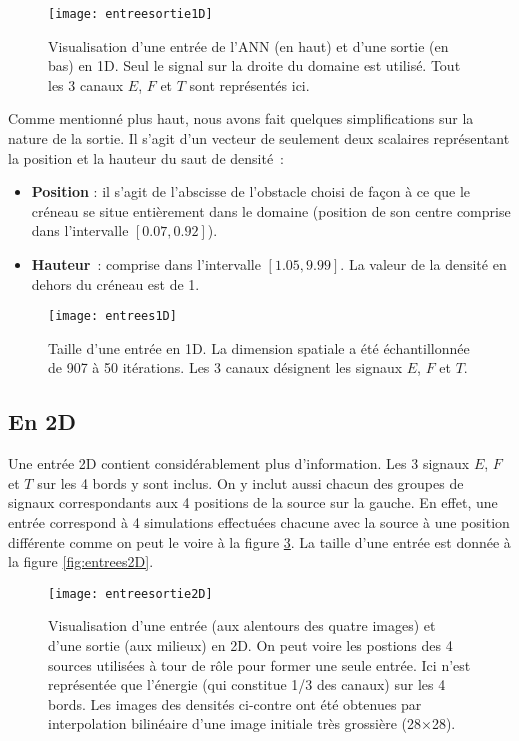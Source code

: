\begin{figure}[!h]
\centering
\texttt{[image: entreesortie1D]} 
\decoRule
\caption[entreesortie1D]{Visualisation d'une entrée de l'ANN (en haut) et d'une sortie (en bas) en 1D. Seul le signal sur la droite du domaine est utilisé. Tout les 3 canaux $E$, $F$ et $T$ sont représentés ici.}
\label{fig:entreesortie1D}
\end{figure}

Comme mentionné plus haut, nous avons fait quelques simplifications sur la nature de la sortie. Il s'agit d'un vecteur de seulement deux scalaires représentant la position et la hauteur du saut de densité :
\begin{itemize}
 \item \textbf{Position} : il s'agit de l'abscisse de l'obstacle choisi de façon à ce que le créneau se situe entièrement dans le domaine (position de son centre comprise dans l'intervalle $[0.07,0.92]$).
 \item \textbf{Hauteur} : comprise dans l'intervalle $[1.05, 9.99]$. La valeur de la densité en dehors du créneau est de 1.
\end{itemize}

\begin{figure}[H]
\centering
\texttt{[image: entrees1D]} 
\decoRule
\caption[entrees1D]{Taille d'une entrée en 1D. La dimension spatiale a été échantillonnée de 907 à 50 itérations. Les 3 canaux désignent les signaux $E$, $F$ et $T$.}
\label{fig:entrees1D}
\end{figure}

\subsection{En 2D}
Une entrée 2D contient considérablement plus d'information. Les 3 signaux $E$, $F$ et $T$ sur les 4 bords y sont inclus. On y inclut aussi chacun des groupes de signaux correspondants aux 4 positions de la source sur la gauche. En effet, une entrée correspond à 4 simulations effectuées chacune avec la source à une position différente comme on peut le voire à la figure \ref{fig:entreesortie2D}. La taille d'une entrée est donnée à la figure \ref{fig:entrees2D}.

\begin{figure}[!h]
\centering
\texttt{[image: entreesortie2D]} 
\decoRule
\caption[entreesortie2D]{Visualisation d'une entrée (aux alentours des quatre images) et d'une sortie (aux milieux) en 2D. On peut voire les postions des 4 sources utilisées à tour de rôle pour former une seule entrée. Ici n'est représentée que l'énergie (qui constitue 1/3 des canaux) sur les 4 bords. Les images des densités ci-contre ont été obtenues par interpolation bilinéaire d'une image initiale très grossière (28×28).}
\label{fig:entreesortie2D}
\end{figure}

